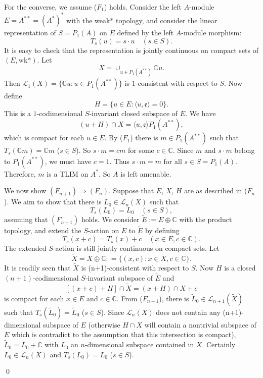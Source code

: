 \documentclass{tran-l}
\numberwithin{equation}{section}
\theoremstyle{definition}
\theoremstyle{remark}
\begin{document}
For the converse, we assume ($F_1$) holds. Consider the left $A$-module $E= A^{**}=(A^*)^*$ with the weak* topology, and consider the linear representation of $S=P_1(A)$ on $E$ defined by the left $A$-module morphism: 
\[
T_s(u) = s\cdot u\quad (s\in S).
\]
 It is easy to check that the representation is jointly continuous on compact sets of $(E, \text{wk*})$.  Let 
 \[
 X = \cup_{u\in P_1(A^{**})} {\mathbb{C}} u.
 \]
  Then ${\mathcal{L}}_1(X) = \{ {\mathbb{C}} u: u\in P_1(A^{**})\}$ is $1$-consistent with respect to $S$. Now define 
  \[
  H = \{u\in E: {\langle} u, {\mathfrak{e}}{\rangle} = 0\}.
  \]
   This is a $1$-codimensional $S$-invariant closed subspace of $E$. We have 
   \[
   (u+H)\cap X = {\langle} u, {\mathfrak{e}} {\rangle} P_1(A^{**}),
   \]
    which is compact for each $u\in E$. By ($F_1$) there is $m\in P_1(A^{**})$ such that $T_s( {\mathbb{C}} m) =  {\mathbb{C}} m$ ($s\in S$). So $s\cdot m = cm$ for some $c\in  {\mathbb{C}}$. Since $m$ and $s\cdot m$ belong to $P_1(A^{**})$, we must have $c=1$. Thus $s\cdot m = m$ for all $s\in S= P_1(A)$. Therefore, $m$ is a TLIM on $A^*$. So $A$ is left amenable.

We now show $(F_{n+1}) \Rightarrow (F_n)$. Suppose that $E$, $X$, $H$ are as described in ($F_n$). We aim to show that there is $L_0\in {\mathcal{L}}_n(X)$ such that \[
T_s(L_0) = L_0\quad (s\in S),
\]
 assuming that $(F_{n+1})$ holds. We consider $\tilde E := E\oplus {\mathbb{C}}$ with the product topology, and extend the $S$-action on $E$ to $\tilde E$ by defining 
 \[
 T_s(x+c) = T_s(x) + c\quad (x\in E, c\in{\mathbb{C}}).
 \]
  The extended $S$-action is still jointly continuous on compact sets. Let 
\[
\tilde X = X \oplus {\mathbb{C}} : = \{(x,c): x\in X, c\in {\mathbb{C}}\}.
\]
 It is readily seen that $\tilde X$ is (n+1)-consistent with respect to $S$. Now $H$ is a closed $(n+1)$-codimensional $S$-invariant subspace of $\tilde E$ and 
\[
[(x+c)+H]\cap \tilde X = (x+H)\cap X + c 
\]
is compact for each $x\in E$ and $c\in {\mathbb{C}}$. From ($F_{n+1}$), there is $\tilde L_0\in {\mathcal{L}}_{n+1}(\tilde X)$ such that $T_s(\tilde L_0) = \tilde L_0$ ($s\in S$). Since ${\mathcal{L}}_n(X)$ does not contain any (n+1)-dimensional subspace of $E$ (otherwise $H\cap X$ will contain a nontrivial subspace of $E$ which is contradict to the assumption that this intersection is compact), $\tilde L_0 = L_0 +{\mathbb{C}}$ with $L_0$ an $n$-dimensional subspace contained in $X$. Certainly $L_0\in {\mathcal{L}}_n(X)$ and $T_s(L_0) = L_0$ ($s\in S$).

\qed
\end{document}
